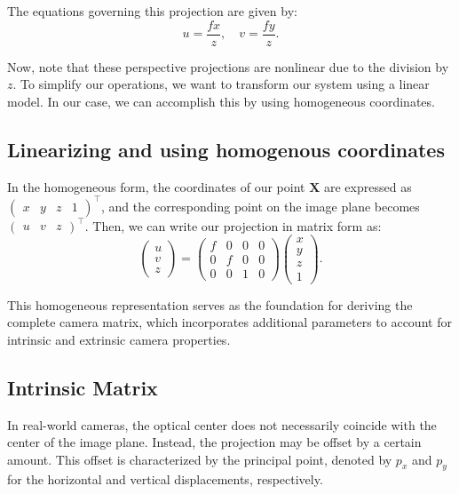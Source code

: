 \documentclass[12pt]{article}
\begin{document}
The equations governing this projection are given by:
$$
u = \frac{f x}{z}, \quad v = \frac{f y}{z}.
$$

Now, note that these perspective projections are nonlinear due to the division by $z$. To simplify our operations, we want to transform our system using a linear model. In our case, we can accomplish this by using homogeneous coordinates.

\subsection{Linearizing and using homogenous coordinates}

In the homogeneous form, the coordinates of our point $\mathbf{X}$ are expressed as $\begin{pmatrix} x & y & z & 1 \end{pmatrix}^\top$, and the corresponding point on the image plane becomes $\begin{pmatrix} u & v & z \end{pmatrix}^\top$. Then, we can write our projection in matrix form as:
$$
\begin{pmatrix} u \\ v \\ z \end{pmatrix} = 
\begin{pmatrix}
    f & 0 & 0 & 0 \\
    0 & f & 0 & 0 \\
    0 & 0 & 1 & 0
\end{pmatrix}
\begin{pmatrix} x \\ y \\ z \\ 1 \end{pmatrix}.
$$

This homogeneous representation serves as the foundation for deriving the complete camera matrix, which incorporates additional parameters to account for intrinsic and extrinsic camera properties.

\subsection{Intrinsic Matrix}

In real-world cameras, the optical center does not necessarily coincide with the center of the image plane. Instead, the projection may be offset by a certain amount. This offset is characterized by the principal point, denoted by $p_x$ and $p_y$ for the horizontal and vertical displacements, respectively.
\end{document}
